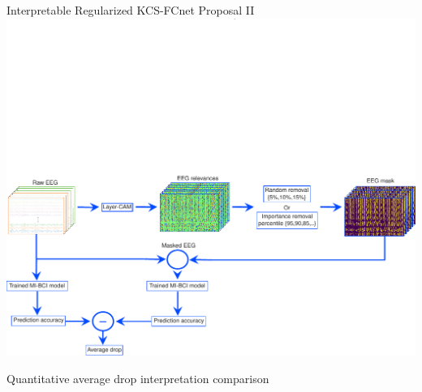 \documentclass[aspectratio=169]{beamer}
\begin{document}
\begin{frame}{Interpretable Regularized KCS-FCnet Proposal II}
    \centering
    \includegraphics[scale=0.5, trim={0 0 0 230},clip]{figures/averagedropimg.pdf}

    Quantitative average drop interpretation comparison
\end{frame}
\end{document}
